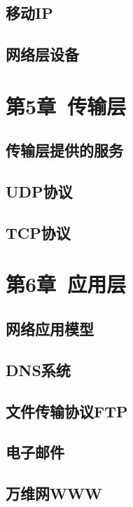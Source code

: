 \documentclass{ctexart}
\begin{document}
\subsection{移动IP}
\subsection{网络层设备}

\section{第5章\ 传输层}
\subsection{传输层提供的服务}
\subsection{UDP协议}
\subsection{TCP协议}

\section{第6章\ 应用层}
\subsection{网络应用模型}
\subsection{DNS系统}
\subsection{文件传输协议FTP}
\subsection{电子邮件}
\subsection{万维网WWW}
\end{document}
